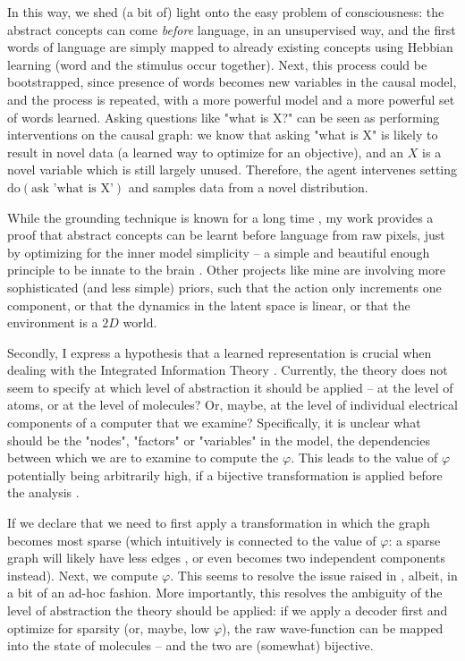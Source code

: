 \documentclass[a4paper,11pt,oneside]{report}
\begin{document}
In this way, we shed (a bit of) light onto the easy problem of consciousness: the abstract concepts can come {\em before} language, in an unsupervised way, and the first words of language are simply mapped to already existing concepts using Hebbian learning (word and the stimulus occur together). Next, this process could be bootstrapped, since presence of words becomes new variables in the causal model, and the process is repeated, with a more powerful model and a more powerful set of words learned. Asking questions like "what is X?" can be seen as performing interventions on the causal graph: we know that asking "what is X" is likely to result in novel data (a learned way to optimize for an objective), and an $X$ is a novel variable which is still largely unused. Therefore, the agent intervenes setting $\mbox{do}(\mbox{ask 'what is X'})$ and samples data from a novel distribution.

While the grounding technique is known for a long time \cite{Hofstadter1994}, my work provides a proof that abstract concepts can be learnt before language from raw pixels, just by optimizing for the inner model simplicity -- a simple and beautiful enough principle to be innate to the brain \cite{Babadi2014}. Other projects like mine are involving more sophisticated (and less simple) priors, such that the action only increments one component, or that the dynamics in the latent space is linear, or that the environment is a $2D$ world.

Secondly, I express a hypothesis that a learned representation is crucial when dealing with the Integrated Information Theory \cite{Tononi2016}. Currently, the theory does not seem to specify at which level of abstraction it should be applied -- at the level of atoms, or at the level of molecules? Or, maybe, at the level of individual electrical components of a computer that we examine? Specifically, it is unclear what should be the "nodes", "factors" or "variables" in the model, the dependencies between which we are to examine to compute the $\varphi$. This leads to the value of $\varphi$ potentially being arbitrarily high, if a bijective transformation is applied before the analysis \cite{Doerig2019}.

If we declare that we need to first apply a transformation in which the graph becomes most sparse (which intuitively is connected to the value of $\varphi$: a sparse graph will likely have less edges \cite{Seth2011,Johnson}, or even becomes two independent components instead). Next, we compute $\varphi$. This seems to resolve the issue raised in \cite{Doerig2019}, albeit, in a bit of an ad-hoc fashion. More importantly, this resolves the ambiguity of the level of abstraction the theory should be applied: if we apply a decoder first and optimize for sparsity (or, maybe, low $\varphi$), the raw wave-function can be mapped into the state of molecules -- and the two are (somewhat) bijective.
\end{document}
